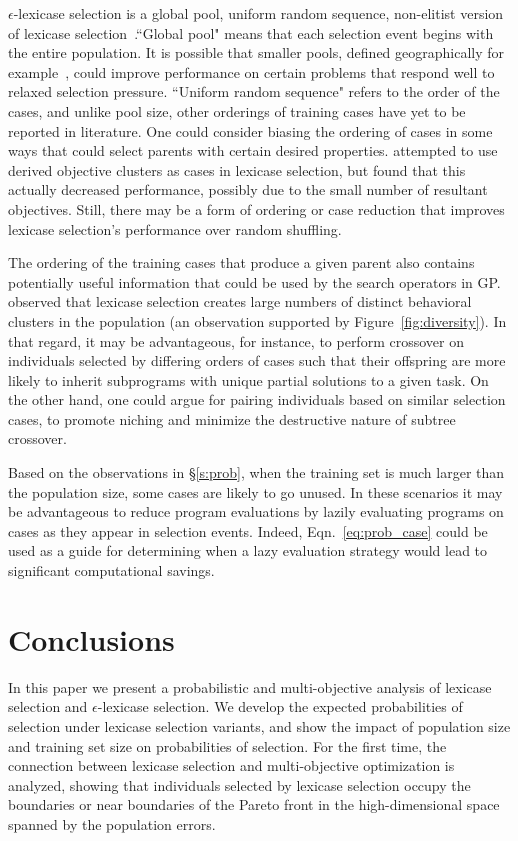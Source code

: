 \documentclass[twoside]{article}
\begin{document}
$\epsilon$-lexicase selection is a global pool, uniform random sequence, non-elitist version of lexicase selection~\citep{spector_assessment_2012}.``Global pool" means that each selection event begins with the entire population. It is possible that smaller pools, defined geographically for example~\citep{spector_trivial_2006}, could improve performance on certain problems that respond well to relaxed selection pressure. ``Uniform random sequence" refers to the order of the cases, and unlike pool size, other orderings of training cases have yet to be reported in literature. One could consider biasing the ordering of cases in some ways that could select parents with certain desired properties. \cite{liskowski_comparison_2015} attempted to use derived objective clusters as cases in lexicase selection, but found that this actually decreased performance, possibly due to the small number of resultant objectives. Still, there may be a form of ordering or case reduction that improves lexicase selection's performance over random shuffling.   
 
The ordering of the training cases that produce a given parent also contains potentially useful information that could be used by the search operators in GP. \cite{helmuth_general_2015-1} observed that lexicase selection creates large numbers of distinct behavioral clusters in the population (an observation supported by Figure~\ref{fig:diversity}). In that regard, it may be advantageous, for instance, to perform crossover on individuals selected by differing orders of cases such that their offspring are more likely to inherit subprograms with unique partial solutions to a given task. On the other hand, one could argue for pairing individuals based on similar selection cases, to promote niching and minimize the destructive nature of subtree crossover.    

Based on the observations in \S\ref{s:prob}, when the training set is much larger than the population size, some cases are likely to go unused. In these scenarios it may be advantageous to reduce program evaluations by lazily evaluating programs on cases as they appear in selection events. Indeed, Eqn.~\ref{eq:prob_case} could be used as a guide for determining when a lazy evaluation strategy would lead to significant computational savings.

\section{Conclusions}\label{s:conclusion}
In this paper we present a probabilistic and multi-objective analysis of lexicase selection and $\epsilon$-lexicase selection. We develop the expected probabilities of selection under lexicase selection variants, and show the impact of population size and training set size on probabilities of selection. For the first time, the connection between lexicase selection and multi-objective optimization is analyzed, showing that individuals selected by lexicase selection occupy the boundaries or near boundaries of the Pareto front in the high-dimensional space spanned by the population errors. 
\end{document}
